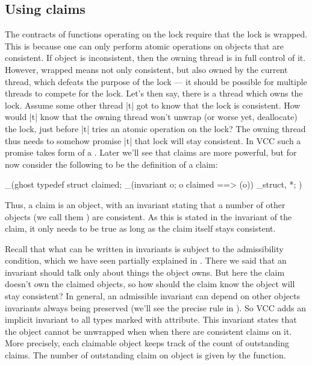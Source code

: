 \subsection{Using claims}
\label{sect:using-claims}

The contracts of functions operating on the lock require that the lock
is wrapped.
This is because one can only perform atomic operations on objects
that are consistent. 
If object is inconsistent, then the owning thread is in full control of it.
However, wrapped means not only consistent, but also owned by the current thread,
which defeats the purpose of the lock --- it should be possible
for multiple threads to compete for the lock.
Let's then say, there is a thread which owns the lock.
Assume some other thread \vcc|t| got to know that the lock is consistent.
How would \vcc|t| know that the owning thread won't unwrap (or worse yet, deallocate) the lock, just
before \vcc|t| tries an atomic operation on the lock?
The owning thread thus needs to somehow promise \vcc|t|
that lock will stay consistent.
In VCC such a promise takes form of a .
Later we'll see that claims are more powerful, but for
now consider the following to be the definition of a claim:

\begin{VCC}
_(ghost 
typedef struct {
  \ptrset claimed;
  _(invariant \forall \object o; o \in claimed ==> \consistent(o))
} \claim_struct, *\claim;
)
\end{VCC}

\noindent
Thus, a claim is an object, with an invariant stating that a number of other objects
(we call them ) are consistent.
As this is stated in the invariant of the claim, it only needs to be true
as long as the claim itself stays consistent.

Recall that what can be written in invariants is subject to the admissibility
condition, which we have seen partially explained in .
There we said that an invariant should talk only about things the object owns.
But here the claim doesn't own the claimed objects,
so how should the claim know the object will stay consistent?
In general, an admissible invariant can depend on other objects invariants always being
preserved (we'll see the precise rule in ).
So VCC adds an implicit invariant to all types
marked with  attribute.
This invariant states that the object cannot be unwrapped when
when there are consistent claims on it.
More precisely, each claimable object keeps track of the count of outstanding
claims.
The number of outstanding claim on object  is given by
the  function.

